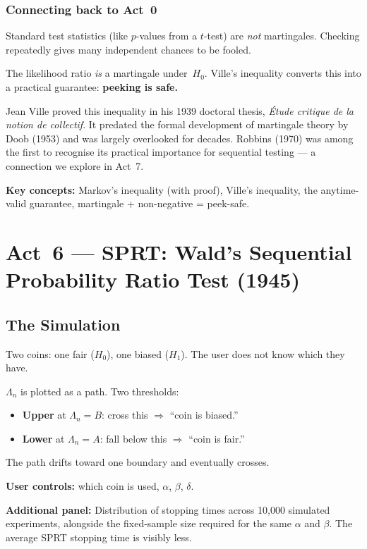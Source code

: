 \documentclass[12pt, a4paper]{article}
\newcommand{\LR}{\Lambda}              %
\begin{document}
\subsubsection*{Connecting back to Act~0}

Standard test statistics (like $p$-values from a $t$-test) are \emph{not}
martingales.  Checking repeatedly gives many independent chances to be fooled.

The likelihood ratio \emph{is} a martingale under~$H_0$.  Ville's inequality
converts this into a practical guarantee: \textbf{peeking is safe.}

\begin{historynote}
Jean Ville proved this inequality in his 1939 doctoral thesis,
\textit{\'Etude critique de la notion de collectif}.  It predated the formal
development of martingale theory by Doob (1953) and was largely overlooked
for decades.  Robbins (1970) was among the first to recognise its practical
importance for sequential testing --- a connection we explore in Act~7.
\end{historynote}

\begin{keytakeaway}
\textbf{Key concepts:} Markov's inequality (with proof), Ville's inequality,
the anytime-valid guarantee, martingale + non-negative = peek-safe.
\end{keytakeaway}


\newpage
\section{Act~6 --- SPRT: Wald's Sequential Probability Ratio Test (1945)}

\subsection{The Simulation}

\begin{simulation}
Two coins: one fair ($H_0$), one biased ($H_1$).  The user does not know
which they have.

$\LR_n$ is plotted as a path.  Two thresholds:
\begin{itemize}[nosep]
  \item \textbf{Upper} at $\LR_n = B$: cross this $\Rightarrow$ ``coin is biased.''
  \item \textbf{Lower} at $\LR_n = A$: fall below this $\Rightarrow$
        ``coin is fair.''
\end{itemize}
The path drifts toward one boundary and eventually crosses.

\textbf{User controls:} which coin is used, $\alpha$, $\beta$, $\delta$.

\textbf{Additional panel:} Distribution of stopping times across 10,000
simulated experiments, alongside the fixed-sample size required for the same
$\alpha$ and $\beta$.  The average SPRT stopping time is visibly less.
\end{simulation}
\end{document}

